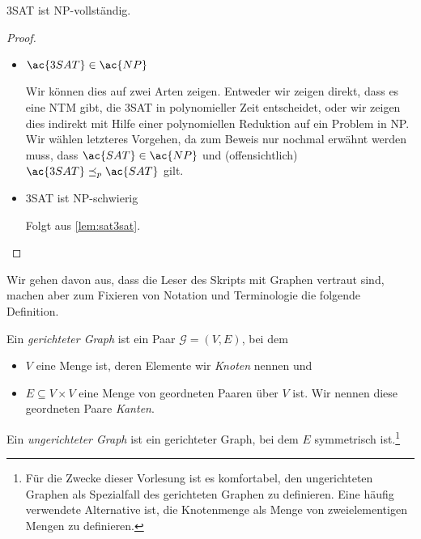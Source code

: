 \begin{Satz}[name={[3SAT ist \ac{NP}-vollständig]}]
	\ac{3SAT} ist \ac{NP}-vollständig.
\end{Satz}
\begin{proof}
 \
 \begin{itemize}
  \item $\ac{3SAT} \in \ac{NP}$
  
  Wir können dies auf zwei Arten zeigen. 
  Entweder wir zeigen direkt, dass es eine \ac{NTM} gibt, die \ac{3SAT} in polynomieller Zeit entscheidet, oder
  wir zeigen dies indirekt mit Hilfe einer polynomiellen Reduktion auf ein Problem in \ac{NP}.
  Wir wählen letzteres Vorgehen, da zum Beweis nur nochmal erwähnt werden muss, dass $\ac{SAT} \in \ac{NP}$ und (offensichtlich) $\ac{3SAT} \preceq_p \ac{SAT}$ gilt.
  
  \item \ac{3SAT} ist \ac{NP}-schwierig
  
  Folgt aus \autoref{lem:sat3sat}.\qedhere
 \end{itemize}
\end{proof}


Wir gehen davon aus, dass die Leser des Skripts mit Graphen vertraut sind, machen aber zum Fixieren von Notation und Terminologie die folgende Definition.
\begin{Def}
 Ein \emph{gerichteter Graph} ist ein Paar $\mathcal{G}=(V,E)$, bei dem
 \begin{itemize}
  \item $V$ eine Menge ist, deren Elemente wir \emph{Knoten} nennen und
  \item $E\subseteq V\times V$ eine Menge von geordneten Paaren über $V$ ist. 
  Wir nennen diese geordneten Paare \emph{Kanten}.
 \end{itemize}
 Ein \emph{ungerichteter Graph} ist ein gerichteter Graph, bei dem $E$ symmetrisch ist.\footnote{%
 Für die Zwecke dieser Vorlesung ist es komfortabel, den ungerichteten Graphen als Spezialfall des gerichteten Graphen zu definieren.
 Eine häufig verwendete Alternative ist, die Knotenmenge als Menge von zweielementigen Mengen zu definieren.}
\end{Def}



